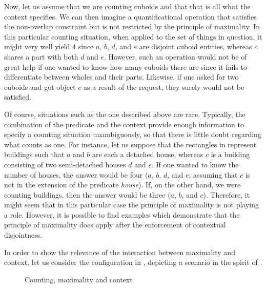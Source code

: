 Now, let us assume that we are counting cuboids and that that is all what the context specifies. We can then imagine a quantificational operation that satisfies the non-overlap constraint but is not restricted by the principle of maximality. In this particular counting situation, when applied to the set of things in question, it might very well yield 4 since $a$, $b$, $d$, and $e$ are disjoint cuboid entities, whereas $c$ shares a part with both $d$ and $e$. However, such an operation would not be of great help if one wanted to know how many cuboids there are since it fails to differentiate between wholes and their parts. Likewise, if one asked for two cuboids and got object $c$ as a result of the request, they surely would not be satisfied.

Of course, situations such as the one described above are rare. Typically, the combination of the predicate and the context provide enough information to specify a counting situation unambiguously, so that there is little doubt regarding what counts as one. For instance, let us suppose that the rectangles in  represent buildings such that $a$ and $b$ are each a detached house, whereas $c$ is a building consisting of two semi-detached houses $d$ and $e$. If one wanted to know the number of houses, the answer would be four ($a$, $b$, $d$, and $e$; assuming that $c$ is not in the extension of the predicate \textit{house}). If, on the other hand, we were counting buildings, then the answer would be three ($a$, $b$, and $c$). Therefore, it might seem that in this particular case the principle of maximality is not playing a role. However, it is possible to find examples which demonstrate that the principle of maximality does apply after the enforcement of contextual disjointness. 

In order to show the relevance of the interaction between maximality and context, let us consider the configuration in , depicting a scenario in the spirit of \citet{rothstein2010counting}. 

\begin{figure}
\centering
{}
\caption{Counting, maximality and context}
\label{fig:counting-maximality-and-context}
\end{figure}

